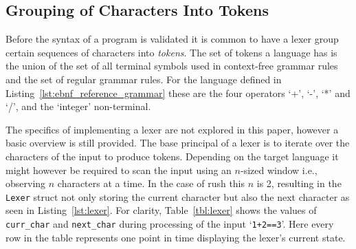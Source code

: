 \subsection{Grouping of Characters Into Tokens}

Before the syntax of a program is validated it is common to have a lexer group certain sequences of characters into \emph{tokens}.
The set of tokens a language has is the union of the set of all terminal symbols used in context-free grammar rules and the set of regular grammar rules.
For the language defined in Listing~\ref{lst:ebnf_reference_grammar} these are the four operators `+', `-', `*' and `/', and the `integer' non-terminal.

The specifics of implementing a lexer are not explored in this paper, however a basic overview is still provided.
The base principal of a lexer is to iterate over the characters of the input to produce tokens.
Depending on the target language it might however be required to scan the input using an $n$-sized window i.e., observing $n$ characters at a time.
In the case of rush this $n$ is 2, resulting in the \Verb|Lexer| struct not only storing the current character but also the next character as seen in Listing~\ref{lst:lexer}.
For clarity, Table~\ref{tbl:lexer} shows the values of \Verb|curr_char| and \Verb|next_char| during processing of the input `\Verb|1+2==3|'.
Here every row in the table represents one point in time displaying the lexer's current state.



